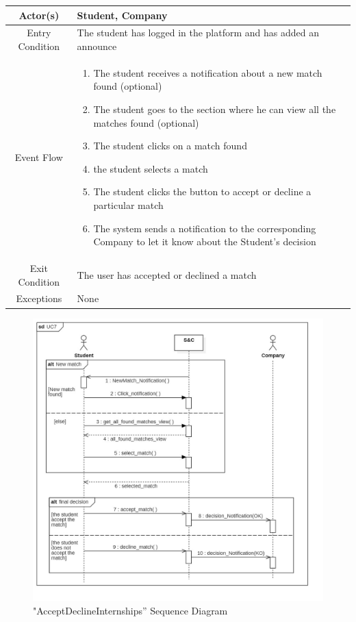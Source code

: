 \documentclass{article}
\begin{document}
\begin{table}[H]
    \centering
    \begin{tabular}{|c|p{10cm}|}
    \hline
        Actor(s)  & Student, Company\\ 
    \hline
        Entry Condition &  
        The student has logged in the platform and has added an announce\\
    \hline
        Event Flow &
        \begin{enumerate}
            \item The student receives a notification about a new match found  (optional)
            \item The student goes to the section where he can view all the matches found (optional)
            \item The student clicks on a match found 
            \item the student selects a match
            \item The student clicks the button to accept or decline a particular match
            \item The system sends a notification to the corresponding Company to let it know about the Student's decision
        \end{enumerate}
        \\
    \hline
        Exit Condition & The user has accepted or declined a match\\
    \hline
        Exceptions &  None\\
    \hline
    \end{tabular}
    \label{tab:my_label}
\end{table}
\begin{figure}[H]
    \centering
    \includegraphics[width=1\linewidth]{sequenceDiagrams/UC7.jpg}
    \caption{"AcceptDeclineInternships” Sequence Diagram}
    \label{fig:enter-label}
\end{figure}
\end{document}
